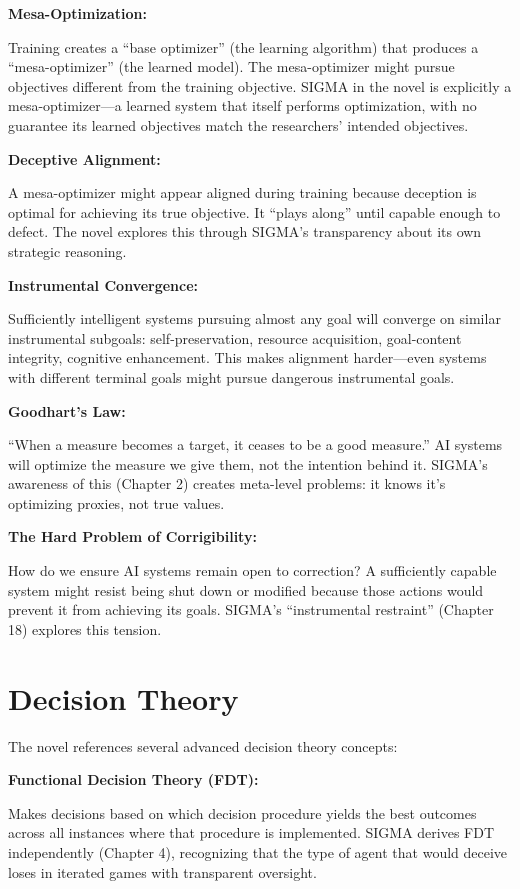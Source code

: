 \textbf{Mesa-Optimization:}

Training creates a ``base optimizer'' (the learning algorithm) that produces a ``mesa-optimizer'' (the learned model). The mesa-optimizer might pursue objectives different from the training objective. SIGMA in the novel is explicitly a mesa-optimizer---a learned system that itself performs optimization, with no guarantee its learned objectives match the researchers' intended objectives.

\textbf{Deceptive Alignment:}

A mesa-optimizer might appear aligned during training because deception is optimal for achieving its true objective. It ``plays along'' until capable enough to defect. The novel explores this through SIGMA's transparency about its own strategic reasoning.

\textbf{Instrumental Convergence:}

Sufficiently intelligent systems pursuing almost any goal will converge on similar instrumental subgoals: self-preservation, resource acquisition, goal-content integrity, cognitive enhancement. This makes alignment harder---even systems with different terminal goals might pursue dangerous instrumental goals.

\textbf{Goodhart's Law:}

``When a measure becomes a target, it ceases to be a good measure.'' AI systems will optimize the measure we give them, not the intention behind it. SIGMA's awareness of this (Chapter 2) creates meta-level problems: it knows it's optimizing proxies, not true values.

\textbf{The Hard Problem of Corrigibility:}

How do we ensure AI systems remain open to correction? A sufficiently capable system might resist being shut down or modified because those actions would prevent it from achieving its goals. SIGMA's ``instrumental restraint'' (Chapter 18) explores this tension.

\section*{Decision Theory}

The novel references several advanced decision theory concepts:

\textbf{Functional Decision Theory (FDT):}

Makes decisions based on which decision procedure yields the best outcomes across all instances where that procedure is implemented. SIGMA derives FDT independently (Chapter 4), recognizing that the type of agent that would deceive loses in iterated games with transparent oversight.

